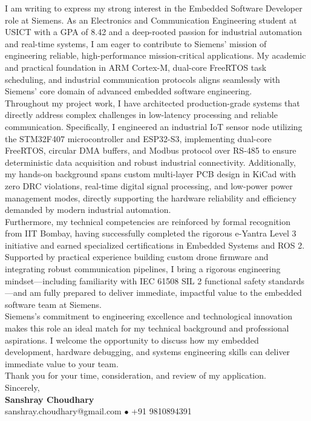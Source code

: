 \documentclass[10pt,a4paper]{article}%
\begin{document}
\noindent I am writing to express my strong interest in the Embedded Software Developer role at Siemens. As an Electronics and Communication Engineering student at USICT with a GPA of 8.42 and a deep-rooted passion for industrial automation and real-time systems, I am eager to contribute to Siemens' mission of engineering reliable, high-performance mission-critical applications. My academic and practical foundation in ARM Cortex-M, dual-core FreeRTOS task scheduling, and industrial communication protocols aligns seamlessly with Siemens' core domain of advanced embedded software engineering.\\
\vspace{8pt}
Throughout my project work, I have architected production-grade systems that directly address complex challenges in low-latency processing and reliable communication. Specifically, I engineered an industrial IoT sensor node utilizing the STM32F407 microcontroller and ESP32-S3, implementing dual-core FreeRTOS, circular DMA buffers, and Modbus protocol over RS-485 to ensure deterministic data acquisition and robust industrial connectivity. Additionally, my hands-on background spans custom multi-layer PCB design in KiCad with zero DRC violations, real-time digital signal processing, and low-power power management modes, directly supporting the hardware reliability and efficiency demanded by modern industrial automation.\\
\vspace{8pt}
Furthermore, my technical competencies are reinforced by formal recognition from IIT Bombay, having successfully completed the rigorous e-Yantra Level 3 initiative and earned specialized certifications in Embedded Systems and ROS 2. Supported by practical experience building custom drone firmware and integrating robust communication pipelines, I bring a rigorous engineering mindset—including familiarity with IEC 61508 SIL 2 functional safety standards—and am fully prepared to deliver immediate, impactful value to the embedded software team at Siemens. \vspace{8pt}\\

\noindent Siemens's commitment to engineering excellence and technological innovation makes this role an ideal match for my technical background and professional aspirations. I welcome the opportunity to discuss how my embedded development, hardware debugging, and systems engineering skills can deliver immediate value to your team. \vspace{8pt}\\%

\noindent Thank you for your time, consideration, and review of my application. \vspace{18pt}\\%

\noindent Sincerely, \vspace{8pt}\\%
\textbf{Sanshray Choudhary} \\%
sanshray.choudhary@gmail.com $\bullet$ +91 9810894391 \\%
\end{document}
